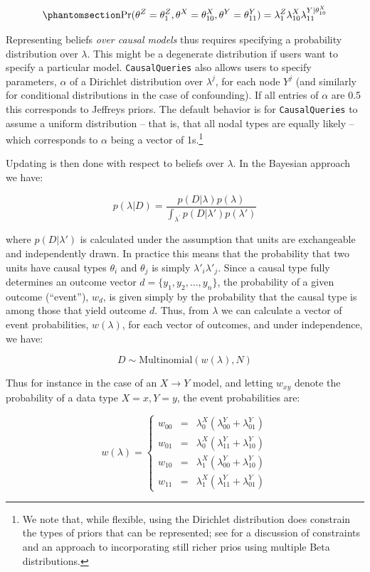 \documentclass[
  11pt,
  article]{jss}
\begin{document}
\begin{equation}\phantomsection\label{eq-join2}{
\Pr(\theta^Z = \theta^Z_1, \theta^X = \theta^X_{10}, \theta^Y = \theta^Y_{11}) = 
\lambda^Z_1\lambda^X_{10}\lambda^{Y|\theta^X_{10}}_{11}
}\end{equation}

Representing beliefs \emph{over causal models} thus requires specifying
a probability distribution over \(\lambda\). This might be a degenerate
distribution if users want to specify a particular model.
\texttt{CausalQueries} also allows users to specify parameters,
\(\alpha\) of a Dirichlet distribution over \(\lambda^j\), for each node
\(Y^j\) (and similarly for conditional distributions in the case of
confounding). If all entries of \(\alpha\) are 0.5 this corresponds to
Jeffreys priors. The default behavior is for \texttt{CausalQueries} to
assume a uniform distribution -- that is, that all nodal types are
equally likely -- which corresponds to \(\alpha\) being a vector of
1s.\footnote{We note that, while flexible, using the Dirichlet
  distribution does constrain the types of priors that can be
  represented; see \citet{irons2023causally} for a discussion of
  constraints and an approach to incorporating still richer prios using
  multiple Beta distributions.}

Updating is then done with respect to beliefs over \(\lambda\). In the
Bayesian approach we have:

\[p(\lambda|D) = \frac{p(D|\lambda)p(\lambda)}{\int_{\lambda^{'}} p(D|\lambda')p(\lambda')}\]

where \(p(D|\lambda')\) is calculated under the assumption that units
are exchangeable and independently drawn. In practice this means that
the probability that two units have causal types \(\theta_i\) and
\(\theta_j\) is simply \(\lambda'_i\lambda'_j\). Since a causal type
fully determines an outcome vector \(d = \{y_1, y_2,\dots,y_n\}\), the
probability of a given outcome (``event''), \(w_d\), is given simply by
the probability that the causal type is among those that yield outcome
\(d\). Thus, from \(\lambda\) we can calculate a vector of event
probabilities, \(w(\lambda)\), for each vector of outcomes, and under
independence, we have:

\[D \sim \text{Multinomial}(w(\lambda), N)\]

Thus for instance in the case of an \(X \rightarrow Y\) model, and
letting \(w_{xy}\) denote the probability of a data type \(X=x, Y=y\),
the event probabilities are:

\[w(\lambda) = \left\{\begin{array}{ccc} w_{00} & = & \lambda^X_0(\lambda^Y_{00} + \lambda^Y_{01})\\ 
w_{01} & = & \lambda^X_0(\lambda^Y_{11} + \lambda^Y_{10})\\
w_{10} & = & \lambda^X_1(\lambda^Y_{00} + \lambda^Y_{10})\\
w_{11} & = & \lambda^X_1(\lambda^Y_{11} + \lambda^Y_{01})\end{array} \right.\]
\end{document}
